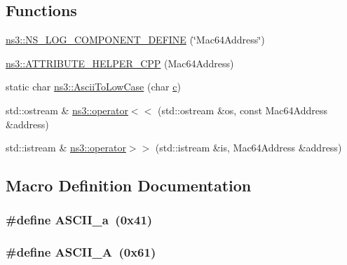\subsection*{Functions}
\begin{DoxyCompactItemize}
\item 
\hyperlink{namespacens3_aacfdf5ad5fe6a105242baa0cd4d9c670}{ns3\+::\+N\+S\+\_\+\+L\+O\+G\+\_\+\+C\+O\+M\+P\+O\+N\+E\+N\+T\+\_\+\+D\+E\+F\+I\+NE} (\char`\"{}Mac64\+Address\char`\"{})
\item 
\hyperlink{namespacens3_a6e822e0a6b631b7d7ac08ce23802cdad}{ns3\+::\+A\+T\+T\+R\+I\+B\+U\+T\+E\+\_\+\+H\+E\+L\+P\+E\+R\+\_\+\+C\+PP} (Mac64\+Address)
\item 
static char \hyperlink{namespacens3_ae7934c60f6570d35f78e1b99577351a0}{ns3\+::\+Ascii\+To\+Low\+Case} (char \hyperlink{mmwave_2model_2fading-traces_2fading__trace__generator_8m_ae0323a9039add2978bf5b49550572c7c}{c})
\item 
std\+::ostream \& \hyperlink{namespacens3_aa62a92e2929fcf4a85b10569b2d8591d}{ns3\+::operator$<$$<$} (std\+::ostream \&os, const Mac64\+Address \&address)
\item 
std\+::istream \& \hyperlink{namespacens3_a941a058d49e6ba31855892cdbeb6b74f}{ns3\+::operator$>$$>$} (std\+::istream \&is, Mac64\+Address \&address)
\end{DoxyCompactItemize}


\subsection{Macro Definition Documentation}
\subsubsection[{\texorpdfstring{A\+S\+C\+I\+I\+\_\+a}{ASCII_a}}]{\setlength{\rightskip}{0pt plus 5cm}\#define A\+S\+C\+I\+I\+\_\+a~(0x41)}\hypertarget{mac64-address_8cc_acb0c7653dabe53da8a7fb03bcad505e7}{}\label{mac64-address_8cc_acb0c7653dabe53da8a7fb03bcad505e7}
\subsubsection[{\texorpdfstring{A\+S\+C\+I\+I\+\_\+A}{ASCII_A}}]{\setlength{\rightskip}{0pt plus 5cm}\#define A\+S\+C\+I\+I\+\_\+A~(0x61)}\hypertarget{mac64-address_8cc_a6ccdee41712ed103021e82cb944f47e6}{}\label{mac64-address_8cc_a6ccdee41712ed103021e82cb944f47e6}
